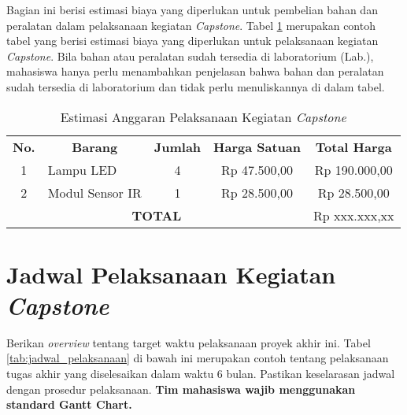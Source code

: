     Bagian ini berisi estimasi biaya yang diperlukan untuk pembelian bahan dan peralatan dalam pelaksanaan kegiatan \textit{Capstone}. Tabel \ref{tab:estimasi_anggaran} merupakan contoh tabel yang berisi estimasi biaya yang diperlukan untuk pelaksanaan kegiatan \textit{Capstone}. Bila bahan atau peralatan sudah tersedia di laboratorium (Lab.), mahasiswa hanya perlu menambahkan penjelasan bahwa bahan dan peralatan sudah tersedia di laboratorium dan tidak perlu menuliskannya di dalam tabel.

        \begin{longtable}{|clcc|c|}
            \caption{Estimasi Anggaran Pelaksanaan Kegiatan \textit{Capstone}}
            \label{tab:estimasi_anggaran}
            \vspace{-0.75em}\\
            \hline
\multicolumn{1}{|c|}{\textbf{No.}} & \multicolumn{1}{c|}{\textbf{Barang}} & \multicolumn{1}{c|}{\textbf{Jumlah}} & \textbf{Harga Satuan} & \textbf{Total Harga} \\ 
            \hline
\multicolumn{1}{|c|}{1}            & \multicolumn{1}{l|}{Lampu LED}       & \multicolumn{1}{c|}{4}               & Rp 47.500,00          & Rp 190.000,00        \\ 
            \hline
\multicolumn{1}{|c|}{2}            & \multicolumn{1}{l|}{Modul Sensor IR} & \multicolumn{1}{c|}{1}               & Rp 28.500,00          & Rp 28.500,00         \\ 
            \hline
\multicolumn{4}{|c|}{\textbf{TOTAL}}                                                                                                     & Rp xxx.xxx,xx        \\ 
            \hline
        \end{longtable}
        
\section{Jadwal Pelaksanaan Kegiatan \textit{Capstone}}

    Berikan \textit{overview} tentang target waktu pelaksanaan proyek akhir ini. Tabel \ref{tab:jadwal_pelaksanaan} di bawah ini merupakan contoh tentang pelaksanaan tugas akhir yang diselesaikan dalam waktu 6 bulan. Pastikan keselarasan jadwal dengan prosedur pelaksanaan. \textbf{Tim mahasiswa wajib menggunakan standard Gantt Chart.}
    

